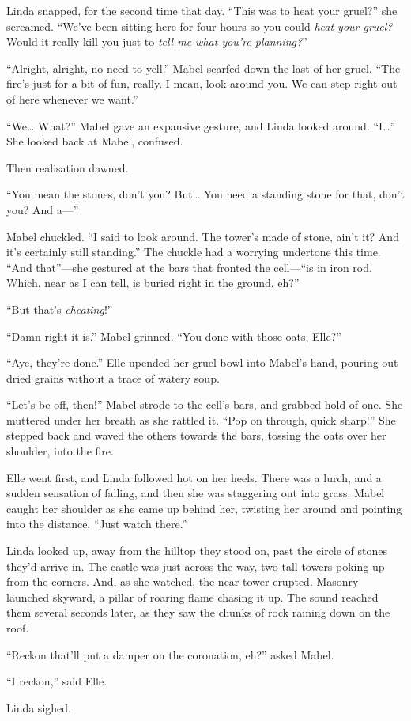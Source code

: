 Linda snapped, for the second time that day.
``This was to heat your gruel?'' she screamed.
``We've been sitting here for four hours so you could \emph{heat your gruel?}
Would it really kill you just to \emph{tell me what you're planning?}''

``Alright, alright, no need to yell.''
Mabel scarfed down the last of her gruel.
``The fire's just for a bit of fun, really.
I mean, look around you.
We can step right out of here whenever we want.''

``We{\dots}
What?''
Mabel gave an expansive gesture, and Linda looked around.
``I{\dots}''
She looked back at Mabel, confused.


Then realisation dawned.

``You mean the stones, don't you?
But{\dots}
You need a standing stone for that, don't you?
And a---''

Mabel chuckled.
``I said to look around.
The tower's made of stone, ain't it?
And it's certainly still standing.''
The chuckle had a worrying undertone this time.
``And that''---she gestured at the bars that fronted the cell---``is in iron rod.
Which, near as I can tell, is buried right in the ground, eh?''

``But that's \emph{cheating}!''

``Damn right it is.''
Mabel grinned.
``You done with those oats, Elle?''

``Aye, they're done.''
Elle upended her gruel bowl into Mabel's hand, pouring out dried grains without a trace of watery soup.

``Let's be off, then!''
Mabel strode to the cell's bars, and grabbed hold of one.
She muttered under her breath as she rattled it.
``Pop on through, quick sharp!''
She stepped back and waved the others towards the bars, tossing the oats over her shoulder, into the fire.

Elle went first, and Linda followed hot on her heels.
There was a lurch, and a sudden sensation of falling, and then she was staggering out into grass.
Mabel caught her shoulder as she came up behind her, twisting her around and pointing into the distance.
``Just watch there.''

Linda looked up, away from the hilltop they stood on, past the circle of stones they'd arrive in.
The castle was just across the way, two tall towers poking up from the corners.
And, as she watched, the near tower erupted.
Masonry launched skyward, a pillar of roaring flame chasing it up.
The sound reached them several seconds later, as they saw the chunks of rock raining down on the roof.

``Reckon that'll put a damper on the coronation, eh?'' asked Mabel.

``I reckon,'' said Elle.

Linda sighed.
